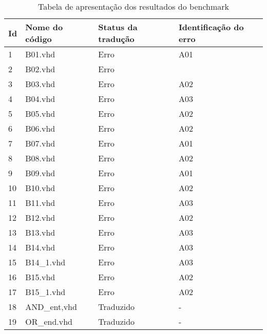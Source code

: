 \begin{table}[H]
\centering
\caption{Tabela de apresentação dos resultados do benchmark}
\label{tabela_resultado}
\begin{tabular}{|l|l|l|l|}
\hline
Id & Nome do código     & Status da tradução & Identificação do erro \\ \hline
1  & B01.vhd            & Erro               & A01                   \\ \hline
2  & B02.vhd            & Erro               &                       \\ \hline
3  & B03.vhd            & Erro               & A02                   \\ \hline
4  & B04.vhd            & Erro               & A03                   \\ \hline
5  & B05.vhd            & Erro               & A02                   \\ \hline
6  & B06.vhd            & Erro               & A02                   \\ \hline
7  & B07.vhd            & Erro               & A01                   \\ \hline
8  & B08.vhd            & Erro               & A02                   \\ \hline
9  & B09.vhd            & Erro               & A01                   \\ \hline
10 & B10.vhd            & Erro               & A02                   \\ \hline
11 & B11.vhd            & Erro               & A03                   \\ \hline
12 & B12.vhd            & Erro               & A02                   \\ \hline
13 & B13.vhd            & Erro               & A03                   \\ \hline
14 & B14.vhd            & Erro               & A03                   \\ \hline
15 & B14\_1.vhd         & Erro               & A03                   \\ \hline
16 & B15.vhd            & Erro               & A02                   \\ \hline
17 & B15\_1.vhd         & Erro               & A02                   \\ \hline
18 & AND\_ent,vhd       & Traduzido          & -                     \\ \hline
19 & OR\_end.vhd        & Traduzido          & -                     \\ \hline

\end{tabular}
\end{table}
